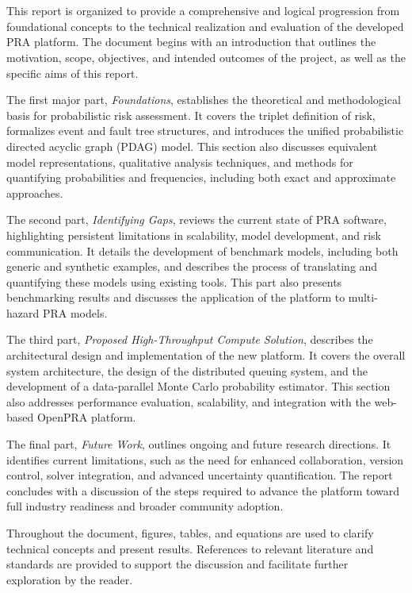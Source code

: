 \section{\color{blue}{Document Layout}}
This report is organized to provide a comprehensive and logical progression from foundational concepts to the technical realization and evaluation of the developed PRA platform. The document begins with an introduction that outlines the motivation, scope, objectives, and intended outcomes of the project, as well as the specific aims of this report.

The first major part, \textit{Foundations}, establishes the theoretical and methodological basis for probabilistic risk assessment. It covers the triplet definition of risk, formalizes event and fault tree structures, and introduces the unified probabilistic directed acyclic graph (PDAG) model. This section also discusses equivalent model representations, qualitative analysis techniques, and methods for quantifying probabilities and frequencies, including both exact and approximate approaches.

The second part, \textit{Identifying Gaps}, reviews the current state of PRA software, highlighting persistent limitations in scalability, model development, and risk communication. It details the development of benchmark models, including both generic and synthetic examples, and describes the process of translating and quantifying these models using existing tools. This part also presents benchmarking results and discusses the application of the platform to multi-hazard PRA models.

The third part, \textit{Proposed High-Throughput Compute Solution}, describes the architectural design and implementation of the new platform. It covers the overall system architecture, the design of the distributed queuing system, and the development of a data-parallel Monte Carlo probability estimator. This section also addresses performance evaluation, scalability, and integration with the web-based OpenPRA platform.

The final part, \textit{Future Work}, outlines ongoing and future research directions. It identifies current limitations, such as the need for enhanced collaboration, version control, solver integration, and advanced uncertainty quantification. The report concludes with a discussion of the steps required to advance the platform toward full industry readiness and broader community adoption.

Throughout the document, figures, tables, and equations are used to clarify technical concepts and present results. References to relevant literature and standards are provided to support the discussion and facilitate further exploration by the reader.
